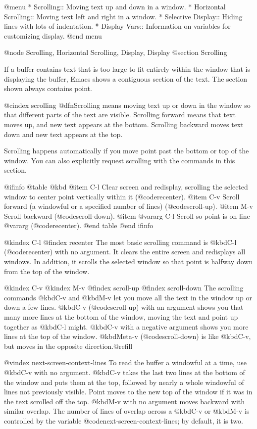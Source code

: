 {{{{@menu
* Scrolling::	           Moving text up and down in a window.
* Horizontal Scrolling::   Moving text left and right in a window.
* Selective Display::      Hiding lines with lots of indentation.
* Display Vars::           Information on variables for customizing display.
@end menu

@node Scrolling, Horizontal Scrolling, Display, Display
@section Scrolling

  If a buffer contains text that is too large to fit entirely within the
window that is displaying the buffer, Emacs shows a contiguous section of
the text.  The section shown always contains point.

@cindex scrolling
  @dfn{Scrolling} means moving text up or down in the window so that
different parts of the text are visible.  Scrolling forward means that text
moves up, and new text appears at the bottom.  Scrolling backward moves
text down and new text appears at the top.

  Scrolling happens automatically if you move point past the bottom or top
of the window.  You can also explicitly request scrolling with the commands
in this section.

@ifinfo
@table @kbd
@item C-l
Clear screen and redisplay, scrolling the selected window to center
point vertically within it (@code{recenter}).
@item C-v
Scroll forward (a windowful or a specified number of lines) (@code{scroll-up}).
@item M-v
Scroll backward (@code{scroll-down}).
@item @var{arg} C-l
Scroll so point is on line @var{arg} (@code{recenter}).
@end table
@end ifinfo

@kindex C-l
@findex recenter
  The most basic scrolling command is @kbd{C-l} (@code{recenter}) with no
argument.  It clears the entire screen and redisplays all windows.  In
addition, it scrolls the selected window so that point is halfway down
from the top of the window.

@kindex C-v
@kindex M-v
@findex scroll-up
@findex scroll-down
  The scrolling commands @kbd{C-v} and @kbd{M-v} let you move all the text
in the window up or down a few lines.  @kbd{C-v} (@code{scroll-up}) with an
argument shows you that many more lines at the bottom of the window, moving
the text and point up together as @kbd{C-l} might.  @kbd{C-v} with a
negative argument shows you more lines at the top of the window.
@kbd{Meta-v} (@code{scroll-down}) is like @kbd{C-v}, but moves in the
opposite direction.@refill

@vindex next-screen-context-lines
  To read the buffer a windowful at a time, use @kbd{C-v} with no
argument.  @kbd{C-v} takes the last two lines at the bottom of the
window and puts them at the top, followed by nearly a whole windowful of
lines not previously visible.  Point moves to the new top of the window
if it was in the text scrolled off the top.  @kbd{M-v} with no argument
moves backward with similar overlap.  The number of lines of overlap
across a @kbd{C-v} or @kbd{M-v} is controlled by the variable
@code{next-screen-context-lines}; by default, it is two.

}}}}
